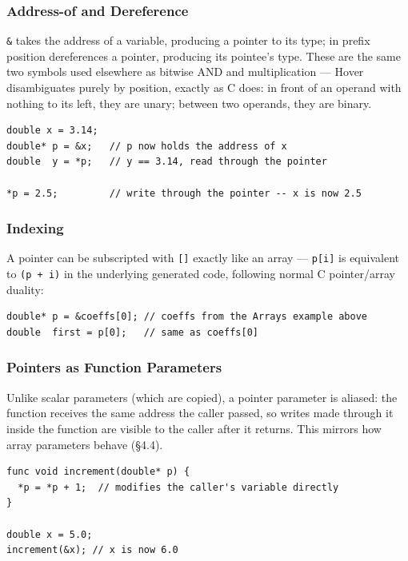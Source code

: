 \documentclass[11pt, a4paper]{article}
\newcommand{\code}[1]{\texttt{\small #1}}
\begin{document}
\subsubsection{Address-of and Dereference}

\code{\&} takes the address of a variable, producing a pointer to its type; \code{*} in prefix position dereferences a pointer, producing its pointee's type. These are the same two symbols used elsewhere as bitwise AND and multiplication — Hover disambiguates purely by position, exactly as C does: in front of an operand with nothing to its left, they are unary; between two operands, they are binary.

\begin{lstlisting}
double x = 3.14;
double* p = &x;   // p now holds the address of x
double  y = *p;   // y == 3.14, read through the pointer

*p = 2.5;         // write through the pointer -- x is now 2.5
\end{lstlisting}

\subsubsection{Indexing}

A pointer can be subscripted with \code{[]} exactly like an array — \code{p[i]} is equivalent to \code{*(p + i)} in the underlying generated code, following normal C pointer/array duality:

\begin{lstlisting}
double* p = &coeffs[0]; // coeffs from the Arrays example above
double  first = p[0];   // same as coeffs[0]
\end{lstlisting}

\subsubsection{Pointers as Function Parameters}

Unlike scalar parameters (which are copied), a pointer parameter is aliased: the function receives the same address the caller passed, so writes made through it inside the function are visible to the caller after it returns. This mirrors how array parameters behave (\S4.4).

\begin{lstlisting}
func void increment(double* p) {
  *p = *p + 1;  // modifies the caller's variable directly
}

double x = 5.0;
increment(&x); // x is now 6.0
\end{lstlisting}
\end{document}
